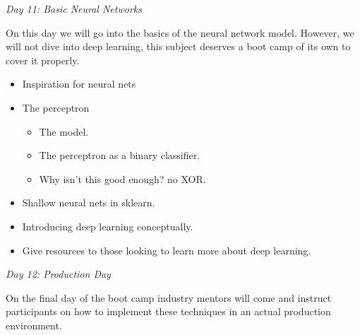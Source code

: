 \documentclass[12pt]{article}
\begin{document}
	
	\vspace{2mm}
	\noindent
	\textit{\large{Day 11: Basic Neural Networks}}
	
		\noindent
		On this day we will go into the basics of the neural network model. However, we will not dive into deep learning, this subject deserves a boot camp of its own to cover it properly.
		\begin{itemize}
			\item Inspiration for neural nets
			\item The perceptron
				\begin{itemize}
					\item The model.
					\item The perceptron as a binary classifier.
					\item Why isn't this good enough? no XOR.
				\end{itemize}
			\item Shallow neural nets in sklearn.
			\item Introducing deep learning conceptually.
			\item Give resources to those looking to learn more about deep learning.
		\end{itemize}
	
	
	\vspace{2mm}
	\noindent
	\textit{\large{Day 12: Production Day}}
		
	\noindent
	On the final day of the boot camp industry mentors will come and instruct participants on how to implement these techniques in an actual production environment.
	
	
	
	
	
	
	
\end{document}
